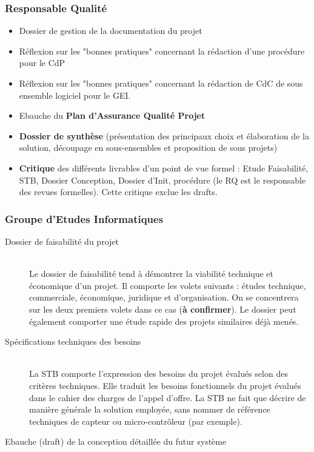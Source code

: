 \documentclass[twoside]{article}
\begin{document}
\subsubsection{Responsable Qualité}

\begin{itemize}
\item Dossier de gestion de la documentation du projet 
\item Réflexion sur les "bonnes pratiques" concernant la rédaction d'une
procédure pour le CdP
\item Réflexion sur les "bonnes pratiques" concernant la rédaction de CdC
de sous ensemble logiciel pour le GEI.
\item Ebauche du \textbf{Plan d'Assurance Qualité Projet} 
\item \textbf{Dossier de synthèse} (présentation des principaux choix et élaboration de
la solution, découpage en sous-ensembles et proposition de sous projets)
\item \textbf{Critique} des différents livrables d'un point de vue formel : Etude Faisabilité, STB, Dossier
Conception, Dossier d'Init, procédure (le RQ est le responsable des revues
formelles). Cette critique exclue les drafts.
\end{itemize}

\subsubsection{Groupe d'Etudes Informatiques}

\begin{description}
\item[Dossier de faisabilité du projet]\hfill\\
    Le dossier de faisabilité tend à démontrer la viabilité technique et
    économique d'un projet. Il comporte les volets suivants : études
    technique, commerciale, économique, juridique et d'organisation. On se
    concentrera sur les deux premiers volets dans ce cas (\textbf{à
    confirmer}). Le dossier peut également comporter une étude rapide des
    projets similaires déjà menés.
\item[Spécifications techniques des besoins]\hfill\\
    La STB comporte l'expression des besoins du projet évalués selon des
    critères techniques. Elle traduit les besoins fonctionnels du projet
    évalués dans le cahier des charges de l'appel d'offre. La STB ne
    fait que décrire de manière générale la solution employée, sans nommer
    de référence techniques de capteur ou micro-contrôleur (par exemple).
\item[Ebauche (draft) de la conception détaillée du futur système]\hfill\\
\end{description}
\end{document}
